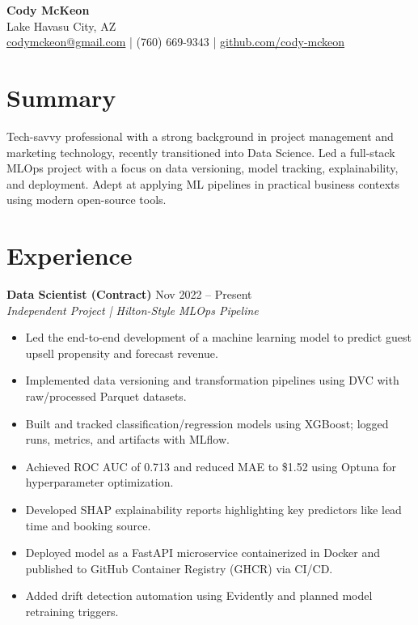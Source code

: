 \documentclass[a4paper,10pt]{article}
\begin{document}
\begin{center}
    {\LARGE \textbf{Cody McKeon}} \\
    \vspace{4pt}
    Lake Havasu City, AZ \\
    \href{mailto:codymckeon@gmail.com}{codymckeon@gmail.com} | (760) 669-9343 | \href{https://github.com/cody-mckeon}{github.com/cody-mckeon}
\end{center}

\vspace{8pt}

\section*{Summary}
Tech-savvy professional with a strong background in project management and marketing technology, recently transitioned into Data Science. Led a full-stack MLOps project with a focus on data versioning, model tracking, explainability, and deployment. Adept at applying ML pipelines in practical business contexts using modern open-source tools.

\section*{Experience}

\textbf{Data Scientist (Contract)} \hfill Nov 2022 -- Present \\
\textit{Independent Project | Hilton-Style MLOps Pipeline} \\
\begin{itemize}[leftmargin=*, itemsep=2pt, parsep=0pt]
    \item Led the end-to-end development of a machine learning model to predict guest upsell propensity and forecast revenue.
    \item Implemented data versioning and transformation pipelines using DVC with raw/processed Parquet datasets.
    \item Built and tracked classification/regression models using XGBoost; logged runs, metrics, and artifacts with MLflow.
    \item Achieved ROC AUC of 0.713 and reduced MAE to \$1.52 using Optuna for hyperparameter optimization.
    \item Developed SHAP explainability reports highlighting key predictors like lead time and booking source.
    \item Deployed model as a FastAPI microservice containerized in Docker and published to GitHub Container Registry (GHCR) via CI/CD.
    \item Added drift detection automation using Evidently and planned model retraining triggers.
\end{itemize}
\end{document}
